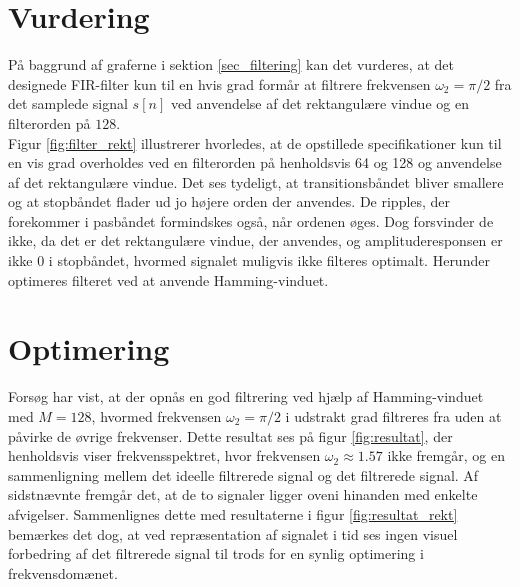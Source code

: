 \section{Vurdering}
På baggrund af graferne i sektion \ref{sec_filtering} kan det vurderes, at det designede FIR-filter kun til en hvis grad formår at filtrere frekvensen $\omega_2=\pi/2$ fra det samplede signal $s[n]$ ved anvendelse af det rektangulære vindue og en filterorden på $128$. \\
Figur \ref{fig:filter_rekt} illustrerer hvorledes, at de opstillede specifikationer kun til en vis grad overholdes ved en filterorden på henholdsvis 64 og 128 og anvendelse af det rektangulære vindue. Det ses tydeligt, at transitionsbåndet bliver smallere og at stopbåndet flader ud jo højere orden der anvendes. De ripples, der forekommer i pasbåndet formindskes også, når ordenen øges. Dog forsvinder de ikke, da det er det rektangulære vindue, der anvendes, og amplituderesponsen er ikke 0 i stopbåndet, hvormed signalet muligvis ikke filteres optimalt. Herunder optimeres filteret ved at anvende Hamming-vinduet.

\section{Optimering}
Forsøg har vist, at der opnås en god filtrering ved hjælp af Hamming-vinduet med $M=128$, hvormed frekvensen $\omega_2 = \pi/2$ i udstrakt grad filtreres fra uden at påvirke de øvrige frekvenser. Dette resultat ses på figur \ref{fig:resultat}, der henholdsvis viser frekvensspektret, hvor frekvensen $\omega_2 \approx 1.57$ ikke fremgår, og en sammenligning mellem det ideelle filtrerede signal og det filtrerede signal. Af sidstnævnte fremgår det, at de to signaler ligger oveni hinanden med enkelte afvigelser. Sammenlignes dette med resultaterne i figur \ref{fig:resultat_rekt} bemærkes det dog, at ved repræsentation af signalet i tid ses ingen visuel forbedring af det filtrerede signal til trods for en synlig optimering i frekvensdomænet. 

